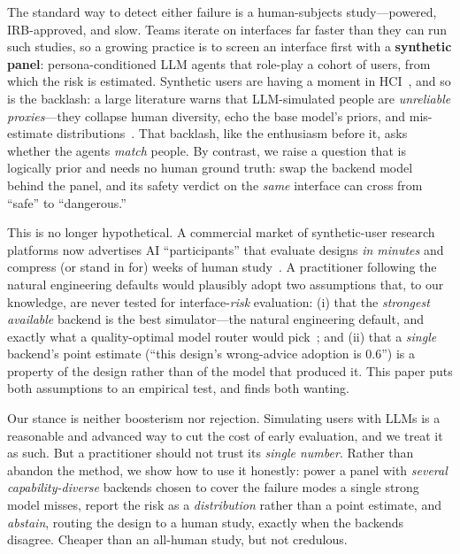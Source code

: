 \documentclass[manuscript,review,anonymous]{acmart}
\begin{document}
The standard way to detect either failure is a human-subjects study---powered, IRB-approved, and slow.
Teams iterate on interfaces far faster than they can run such studies, so a growing practice is to screen
an interface first with a \textbf{synthetic panel}: persona-conditioned LLM agents that role-play a cohort
of users, from which the risk is estimated. Synthetic users are having a moment in
HCI~\cite{park2022social,argyle2023out,aher2023using}, and so is the backlash: a large literature warns
that LLM-simulated people are \emph{unreliable proxies}---they collapse human diversity, echo the base
model's priors, and mis-estimate distributions~\cite{santurkar2023whose,cao2025specializing,%
bisbee2024synthetic,dominguez2024questioning,cheng2023compost,hamalainen2023evaluating}. That backlash,
like the enthusiasm before it, asks whether the agents \emph{match} people. By contrast, we raise a
question that is logically prior and needs no human ground truth: swap the backend model behind the panel,
and its safety verdict on the \emph{same} interface can cross from ``safe'' to ``dangerous.''

This is no longer hypothetical. A commercial market of synthetic-user research platforms now advertises AI
``participants'' that evaluate designs \emph{in minutes} and compress (or stand in for) weeks of human
study~\cite{syntheticusers,uxia_synthetic}. A practitioner following the natural engineering defaults would
plausibly adopt two assumptions that, to our
knowledge, are never tested for interface-\emph{risk} evaluation: (i) that the \emph{strongest available}
backend is the best simulator---the natural engineering default, and exactly what a quality-optimal model
router would pick~\cite{ong2025routellm}; and (ii) that a \emph{single} backend's point estimate
(``this design's wrong-advice adoption is 0.6'') is a property of the design rather than of the model that
produced it. This paper puts both assumptions to an empirical test, and finds both wanting.

Our stance is neither boosterism nor rejection. Simulating users with LLMs is a reasonable and advanced way
to cut the cost of early evaluation, and we treat it as such. But a practitioner should not trust its
\emph{single number}. Rather than abandon the method, we show how to use it honestly: power a panel
with \emph{several capability-diverse} backends chosen to cover the failure modes a single strong model
misses, report the risk as a \emph{distribution} rather than a point estimate, and \emph{abstain}, routing
the design to a human study, exactly when the backends disagree. Cheaper than an all-human study, but not
credulous.
\end{document}
